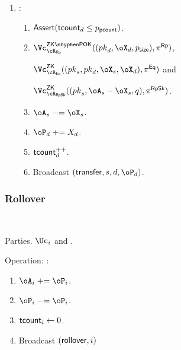 \begin{protocol}
\begin{enumerate}
		
		\item  \Cc: 
		
		\begin{enumerate}
			
			\item  $\mathsf{Assert}(\mathsf{tcount}_d \le p_{\mathsf{pcount}})$.
				
			\item   $\vZKPOK{\rRp}((\pk_d,\oX_d,\psize),\pi^\RPs)$,
			
			 $\vZK{\rEq}((\pk_s,\pk_d,\oX_s,\oX_d),\pi^\Eqs)$ and
			 
			  $\vZK{\rRpSk}((\pk_s,\oA_s-\oX_s,q),\pi^\RpSkS)$. 
			
	
		
		
		     \item   $\oA_s\minuseq \oX_s$. 
              
              \item  $\oP_d \pluseq X_d$. 
              
              \item $\mathsf{tcount}_d^{++}$.
              
		     
		     \item Broadcast $(\transfer,s,d,\oP_d)$.
		\end{enumerate}
		
	\end{enumerate}
	
\end{protocol}



\subsubsection{Rollover}

\begin{protocol}~\label{prot:ConfidentialTransactions:Rollover}
	\item[Parties.] $\Uc_i$ and \Cc.
	
\item[Operation:] \Cc:
	
	\begin{enumerate}
	
	\item $\oA_i  \pluseq \oP_i$.
	
	
	\item  $\oP_i \minuseq \oP_i$.
	
	\item  $\mathsf{tcount}_i \leftarrow 0$.
	
	
	\item  Broadcast $(\mathsf{rollover},i)$
	
	
\end{enumerate}
	
\end{protocol}

